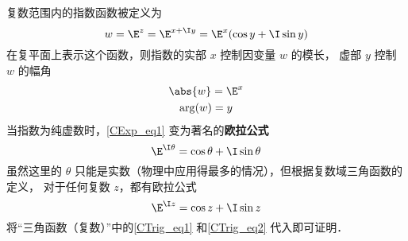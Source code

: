 
复数范围内的指数函数被定义为
 \begin{equation}\label{CExp_eq1}
w = {\E^z} = {\E^{x + \I y}} = {\E^x}(\cos y + \I\sin y)
\end{equation}
在复平面上表示这个函数，则指数的实部 $x$ 控制因变量 $w$ 的模长， 虚部 $y$ 控制 $w$ 的幅角
 \begin{gather}
\abs{w} = {\E^x} \\
\arg(w) = y
\end{gather}
当指数为纯虚数时，\autoref{CExp_eq1} 变为著名的\textbf{欧拉公式}
\begin{equation}\label{CExp_eq2}
{\E^{\I \theta}} = {\cos \theta + \I\sin \theta}
\end{equation}
虽然这里的 $\theta$ 只能是实数（物理中应用得最多的情况），但根据复数域三角函数的定义， 对于任何复数 $z$，都有欧拉公式
\begin{equation}
{\E^{\I z}} = {\cos z + \I\sin z}
\end{equation}
将“三角函数（复数）”中的\autoref{CTrig_eq1} 和\autoref{CTrig_eq2} 代入即可证明．